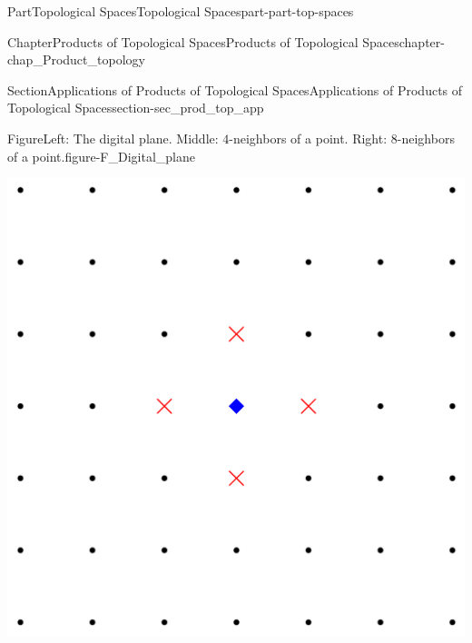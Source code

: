 \documentclass[oneside,10pt,]{book}
\numberwithin{equation}{chapter}
\begin{document}
\begin{partptx}{Part}{Topological Spaces}{}{Topological Spaces}{}{}{part-part-top-spaces}
\begin{chapterptx}{Chapter}{Products of Topological Spaces}{}{Products of Topological Spaces}{}{}{chapter-chap_Product_topology}
\begin{sectionptx}{Section}{Applications of Products of Topological Spaces}{}{Applications of Products of Topological Spaces}{}{}{section-sec_prod_top_app}
\begin{figureptx}{Figure}{Left: The digital plane. Middle: \(4\)-neighbors of a point. Right: \(8\)-neighbors of a point.}{figure-F_Digital_plane}{}
\begin{sidebyside}{3}{0.0166666666666667}{0.0166666666666667}{0.0333333333333333}
\begin{sbspanel}{0.3}
\end{sbspanel}%
\begin{sbspanel}{0.3}%
\includegraphics[width=\linewidth]{external/neighbors_4.pdf}
\end{sbspanel}%
\begin{sbspanel}{0.3}%

\end{sbspanel}
\end{sidebyside}
\end{figureptx}
\end{sectionptx}
\end{chapterptx}
\end{partptx}
\end{document}
